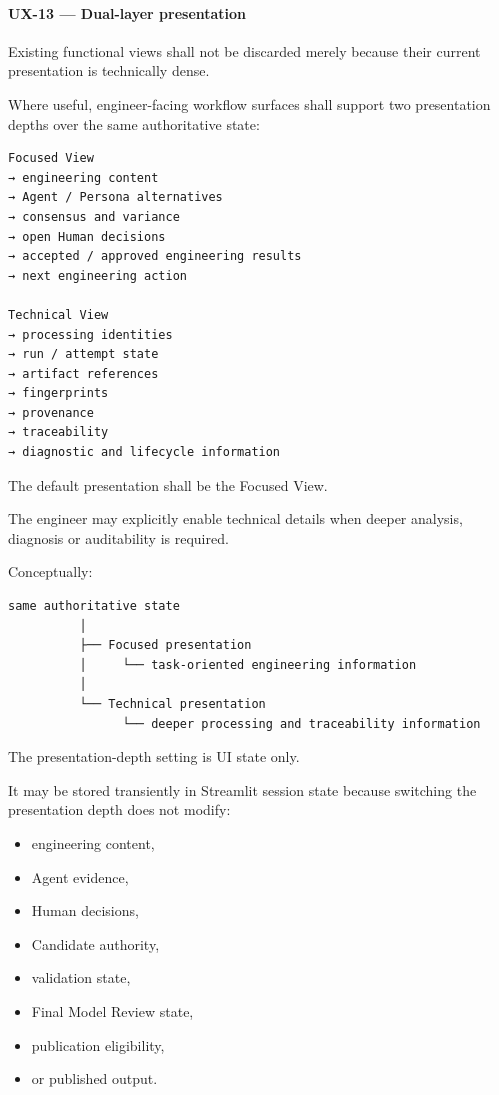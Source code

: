 \hypertarget{ux-13--dual-layer-presentation}{%
\paragraph{UX-13 --- Dual-layer presentation}\label{ux-13--dual-layer-presentation}}

Existing functional views shall not be discarded merely because their current presentation is technically dense.

Where useful, engineer-facing workflow surfaces shall support two presentation depths over the same authoritative state:

\begin{verbatim}
Focused View
→ engineering content
→ Agent / Persona alternatives
→ consensus and variance
→ open Human decisions
→ accepted / approved engineering results
→ next engineering action

Technical View
→ processing identities
→ run / attempt state
→ artifact references
→ fingerprints
→ provenance
→ traceability
→ diagnostic and lifecycle information
\end{verbatim}

The default presentation shall be the Focused View.

The engineer may explicitly enable technical details when deeper analysis, diagnosis or auditability is required.

Conceptually:

\begin{verbatim}
same authoritative state
          │
          ├── Focused presentation
          │     └── task-oriented engineering information
          │
          └── Technical presentation
                └── deeper processing and traceability information
\end{verbatim}

The presentation-depth setting is UI state only.

It may be stored transiently in Streamlit session state because switching the presentation depth does not modify:

\begin{itemize}
\tightlist
\item
  engineering content,
\item
  Agent evidence,
\item
  Human decisions,
\item
  Candidate authority,
\item
  validation state,
\item
  Final Model Review state,
\item
  publication eligibility,
\item
  or published output.
\end{itemize}

